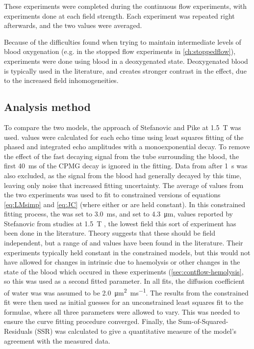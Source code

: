These experiments were completed during the continuous flow experiments, with experiments done at each field strength.
Each experiment was repeated right afterwards, and the two \Ttwo values were averaged.

Because of the difficulties found when trying to maintain intermediate levels of blood oxygenation (e.g. in the stopped flow experiments in \autoref{ch:stoppedflow}), experiments were done using blood in a deoxygenated state.
Deoxygenated blood is typically used in the literature, and creates stronger contrast in the \Ttwo effect, due to the increased field inhomogeneities.

\subsection*{Analysis method}
To compare the two models, the approach of Stefanovic and Pike at \SI{1.5}{T} \cite{StefanovicHumanwholebloodrelaxometry2004} was used.
\Ttwo values were calculated for each echo time using least squares fitting of the phased and integrated echo amplitudes with a monoexponential decay.
To remove the effect of the fast decaying signal from the tube surrounding the blood, the first \SI{40}{ms} of the CPMG decay is ignored in the fitting.
Data from after \SI{1}{\second} was also excluded, as the signal from the blood had generally decayed by this time, leaving only noise that increased fitting uncertainty.
The average of \Ttwo values from the two experiments was used to fit to constrained versions of equations \ref{eq:LMsimp} and \ref{eq:JC} (where either \Texc or \rc are held constant).
In this constrained fitting process, the \Texc was set to \SI{3.0}{ms}, and \rc set to \SI{4.3}{\micro\metre}, values reported by Stefanovic from studies at \SI{1.5}{T} \cite{StefanovicHumanwholebloodrelaxometry2004}, the lowest field this sort of experiment has been done in the literature.
Theory suggests that these should be field independent, but a range of \Texc and \rc values have been found in the literature.
Their experiments typically held \TtwoO constant in the constrained models, but this would not have allowed for changes in intrinsic \Ttwo due to haemolysis or other changes in the state of the blood which occured in these experiments (\autoref{sec:contflow-hemolysis}, so this was used as a second fitted parameter.
In all fits, the diffusion coefficient of water was was assumed to be \SI[per-mode=reciprocal]{2.0}{\micro\metre\squared\per\milli\second}.
The results from the constrained fit were then used as initial guesses for an unconstrained least squares fit to the formulae, where all three parameters were allowed to vary.
This was needed to ensure the curve fitting procedure converged.
Finally, the Sum-of-Squared-Residuals (SSR) was calculated to give a quantitative measure of the model's agreement with the measured data.

